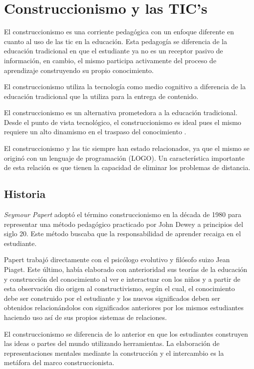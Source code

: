 \section{Construccionismo y las TIC's}
\label{sec:tics_CONSTRUCCIONISMO}

El construccionismo es una corriente pedagógica con un enfoque diferente en
cuanto al uso de las \Gls{tic} en la educación. Esta pedagogía se diferencia de
la educación tradicional en que el estudiante ya no es un receptor pasivo de
información, en cambio, el mismo participa activamente del proceso de
aprendizaje construyendo su propio conocimiento. 

El construccionismo utiliza la tecnología como medio cognitivo  a diferencia de
la educación tradicional que la utiliza para la entrega de contenido. 

El construccionismo es un alternativa prometedora a la educación
tradicional. Desde el punto de vista tecnológico, el construccionismo es ideal
pues el mismo requiere un alto dinamismo en el traspaso del conocimiento
\cite{sasha:construtivism}. 

El construccionismo y las \Gls{tic} siempre han estado relacionados, ya que el
mismo se originó con un lenguaje de programación (LOGO)\cite{ict:ttc}. Un
característica importante de esta relación es que tienen la capacidad de
eliminar los problemas de distancia\cite{mariluz:seiousgames}.


\subsection{Historia}

\emph{Seymour Papert} adoptó el término construccionismo en la década de 1980
para representar una método pedagógico practicado por John Dewey a principios
del siglo 20. Este método buscaba que la responsabilidad de aprender recaiga en
el estudiante. 

Papert trabajó directamente con el psicólogo evolutivo y filósofo suizo Jean
Piaget. Este último, había elaborado con anterioridad sus teorías de la
educación y construcción del conocimiento al ver e interactuar con los niños y a
partir de esta observación dio origen al constructivismo, según el cual, el
conocimiento debe ser construido por el estudiante y los nuevos significados
deben ser obtenidos relacionándolos con significados anteriores por los mismos
estudiantes haciendo uso así de sus propios sistemas de relaciones.

El construccionismo se diferencia de lo anterior en que los estudiantes
construyen las ideas o partes del mundo utilizando herramientas. La elaboración
de representaciones mentales mediante la construcción y el intercambio es la
metáfora del marco construccionista. 

